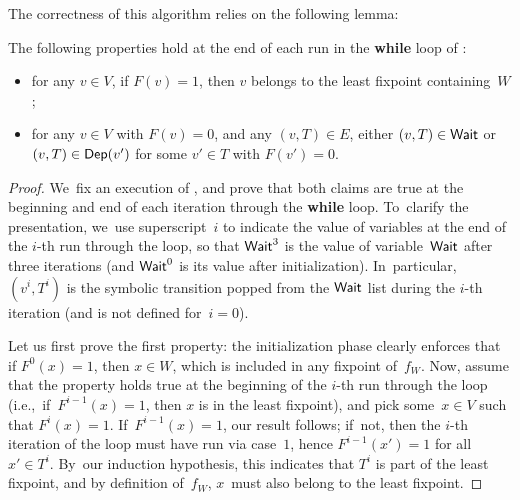 The correctness of this algorithm relies on the following lemma:
\begin{lemma}[\cite{LS98}]\label{10-lemma:ls98}
  The following properties hold at the end of each run in the
  \textbf{while} loop of :
  \begin{itemize}
  \item for any $v\in V$, if $F(v)=1$, then $v$ belongs to the least
    fixpoint containing~$W$;
  \item for any $v\in V$ with $F(v)=0$, and any $(v,T)\in E$, either
    $(v,T)\in \textsf{Wait}$ or $(v,T)\in\textsf{Dep}(v')$ for some $v'\in T$ with
    $F(v')=0$.
  \end{itemize}
\end{lemma}

\begin{proof}
  We~fix an execution of , and prove that both
  claims are true at the beginning and end of each iteration through
  the \textbf{while} loop. To~clarify the presentation, we~use
  superscript~$i$ to indicate the value of variables at the end of the
  $i$-th run through the loop, so that $\textsf{Wait}^3$ is the value of
  variable~$\textsf{Wait}$ after three iterations (and $\textsf{Wait}^0$ is its value
  after initialization). In~particular, $(v^i,T^i)$ is the
  symbolic transition popped from the $\textsf{Wait}$ list during the $i$-th
  iteration (and is not defined for~$i=0$).

  Let us first prove the first property: the initialization phase
  clearly enforces that if $F^0(x)=1$, then $x\in W$, which is
  included in any fixpoint of~$f_W$. Now, assume that the property
  holds true at the beginning of the $i$-th run through the loop
  (i.e.,~if~$F^{i-1}(x)=1$, then $x$ is in the least fixpoint), and
  pick some~$x\in V$ such that $F^i(x)=1$. If~$F^{i-1}(x)=1$, our
  result follows; if~not, then the $i$-th iteration of the loop must
  have run via case~$1$, hence $F^{i-1}(x')=1$ for all~$x'\in
  T^i$. By~our induction hypothesis, this indicates that $T^i$ is part
  of the least fixpoint, and by definition of~$f_W$, $x$~must also
  belong to the least fixpoint.



\end{proof}

